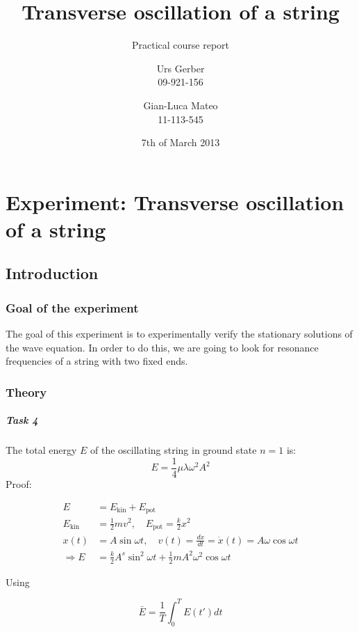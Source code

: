 \documentclass{scrreprt}
\author{Urs Gerber\\09-921-156 \and Gian-Luca Mateo\\11-113-545}
\date{7th of March 2013}
\title{Transverse oscillation of a string}
\subtitle{Practical course report}
\begin{document}
\maketitle

\tableofcontents
\newpage

\chapter{Experiment: Transverse oscillation of a string}
\section{Introduction}

\subsection{Goal of the experiment}
The goal of this experiment is to experimentally verify the stationary solutions of the wave equation. In order to do this, we are going to look for resonance frequencies of a string with two fixed ends.
\subsection{Theory}

\paragraph{Task 4}
The total energy $E$ of the oscillating string in ground state $n=1$ is:
\begin{equation}
E=\frac{1}{4} \mu \lambda \omega^2 A^2
\end{equation}
Proof:

\begin{align}
E &= E_{\text{kin}} + E_{\text{pot}}\\
E_{\text{kin}} &= \frac{1}{2} m v^2 , \quad E_{\text{pot}} = \frac{k}{2} x^2\\
x(t) &= A \sin{\omega t} , \quad v(t) = \frac{dx}{dt} = \dot{x}(t) = A \omega \cos{\omega t}\\
\Rightarrow E &= \frac{k}{2} A^s \sin^2{\omega t} + \frac{1}{2} m A^2 \omega^2 \cos{\omega t}
\end{align}

Using

\begin{equation}
\bar{E} = \frac{1}{T} \int_0^T{E(t') dt}
\end{equation}
\end{document}
